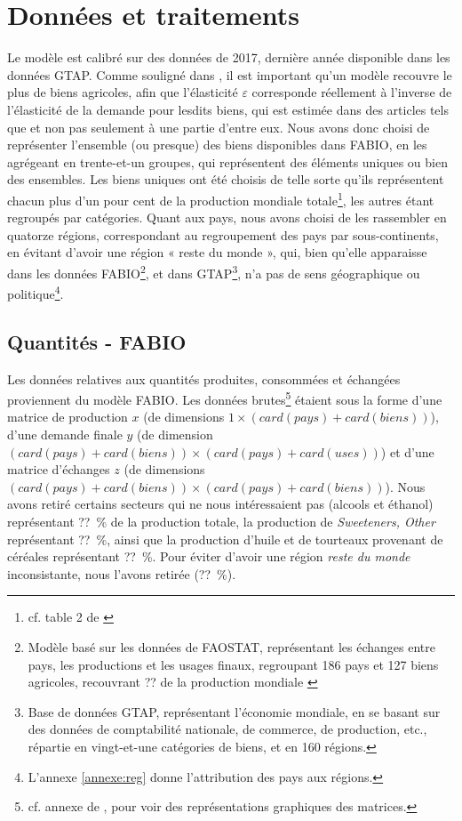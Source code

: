 \section{Données et traitements}
Le modèle est calibré sur des données de 2017, dernière année disponible dans les données GTAP. Comme souligné dans \cite{Gouel2021}, il est important qu'un modèle recouvre le plus de biens agricoles, afin que l'élasticité $\varepsilon$ corresponde réellement à l'inverse de l'élasticité de la demande pour lesdits biens, qui est estimée dans des articles tels que \cite{Comin2021} et non pas seulement à une partie d'entre eux. Nous avons donc choisi de représenter l'ensemble (ou presque) des biens disponibles dans FABIO, en les agrégeant en trente-et-un groupes, qui représentent des éléments uniques ou bien des ensembles. Les biens uniques ont été choisis de telle sorte qu'ils représentent chacun plus d'un pour cent de la production mondiale totale\footnote{cf. table 2 de \cite{Gouel2021}}, les autres étant regroupés par catégories. Quant aux pays, nous avons choisi de les rassembler en quatorze régions, correspondant au regroupement des pays par sous-continents, en évitant d'avoir une région « reste du monde », qui, bien qu'elle apparaisse dans les données FABIO\footnote{Modèle basé sur les données de FAOSTAT, représentant les échanges entre pays, les productions et les usages finaux, regroupant 186 pays et 127 biens agricoles, recouvrant ?? de la production mondiale \cite{Bruckner2019}}, et dans GTAP\footnote{Base de données GTAP, représentant l'économie mondiale, en se basant sur des données de comptabilité nationale, de commerce, de production, etc., répartie en vingt-et-une catégories de biens, et en 160 régions.}, n'a pas de sens géographique ou politique\footnote{L'annexe \ref{annexe:reg} donne l'attribution des pays aux régions.}.


\subsection{Quantités - FABIO}

Les données relatives aux quantités produites, consommées et échangées proviennent du modèle FABIO. Les données brutes\footnote{cf. annexe de \cite{Bruckner2019}, pour voir des représentations graphiques des matrices.} étaient sous la forme d'une matrice de production $x$ (de dimensions $1 \times (card(pays)+card(biens))$), d'une demande finale $y$ (de dimension $(card(pays)+card(biens)) \times (card(pays)+card(uses))$) et d'une matrice d'échanges $z$ (de dimensions $(card(pays)+card(biens)) \times (card(pays)+card(biens))$). Nous avons retiré certains secteurs qui ne nous intéressaient pas (alcools et éthanol) représentant ??~\% de la production totale, la production de \textit{Sweeteners, Other} représentant ??~\%, ainsi que la production d'huile et de tourteaux provenant de céréales représentant ??~\%. Pour éviter d'avoir une région \textit{reste du monde} inconsistante, nous l'avons retirée (??~\%).

